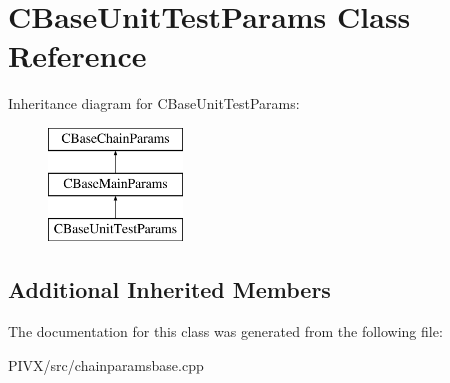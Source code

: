 \hypertarget{class_c_base_unit_test_params}{}\section{C\+Base\+Unit\+Test\+Params Class Reference}
\label{class_c_base_unit_test_params}
Inheritance diagram for C\+Base\+Unit\+Test\+Params\+:\begin{figure}[H]
\begin{center}
\leavevmode
\includegraphics[height=3.000000cm]{class_c_base_unit_test_params}
\end{center}
\end{figure}
\subsection*{Additional Inherited Members}


The documentation for this class was generated from the following file\+:\begin{DoxyCompactItemize}
\item 
P\+I\+V\+X/src/chainparamsbase.\+cpp\end{DoxyCompactItemize}
